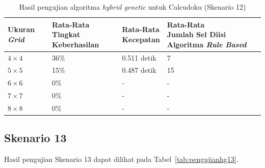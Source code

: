 \begin{table}
\centering
\captionsetup{justification=centering}
\caption[Hasil pengujian algoritma \textit{hybrid genetic} untuk Calcudoku (Skenario 12)]{Hasil pengujian algoritma \textit{hybrid genetic} untuk Calcudoku (Skenario 12)}
\begin{tabular}{| l | l | l | l |}
\hline
Ukuran \textit{Grid} & \makecell[l]{Rata-Rata \\ Tingkat Keberhasilan} & \makecell[l]{Rata-Rata \\ Kecepatan} & \makecell[l]{Rata-Rata \\ Jumlah Sel Diisi Algoritma \textit{Rule Based}} \\
\hline \hline
\begin{math}4 \times 4\end{math} & 36\% & 0.511 detik & 7 \\
\hline
\begin{math}5 \times 5\end{math} & 15\% & 0.487 detik & 15 \\
\hline
\begin{math}6 \times 6\end{math} & 0\% & - & - \\
\hline
\begin{math}7 \times 7\end{math} & 0\% & - & - \\
\hline
\begin{math}8 \times 8\end{math} & 0\% & - & - \\
\hline
\end{tabular}
\label{tab:pengujianhg12}
\end{table}

\subsection{Skenario 13}
\label{sec:skenario13}

Hasil pengujian Skenario 13 dapat dilihat pada Tabel~\ref{tab:pengujianhg13}.


